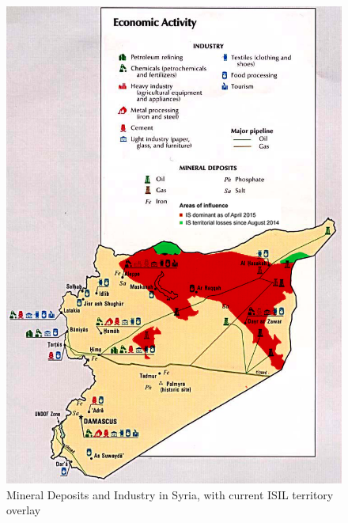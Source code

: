\documentclass{report}
\begin{document}
\begin{figure}[H]
 \centering
 \includegraphics[trim = 0cm 0cm 0cm 0cm, clip,scale=0.5]{./figures/syria_minerals2.png}
   \caption{Mineral Deposits and Industry in Syria,  with current ISIL territory overlay \cite{Ellis2005}}
     \label{fig:syria_minerals}
\end{figure}
\end{document}
